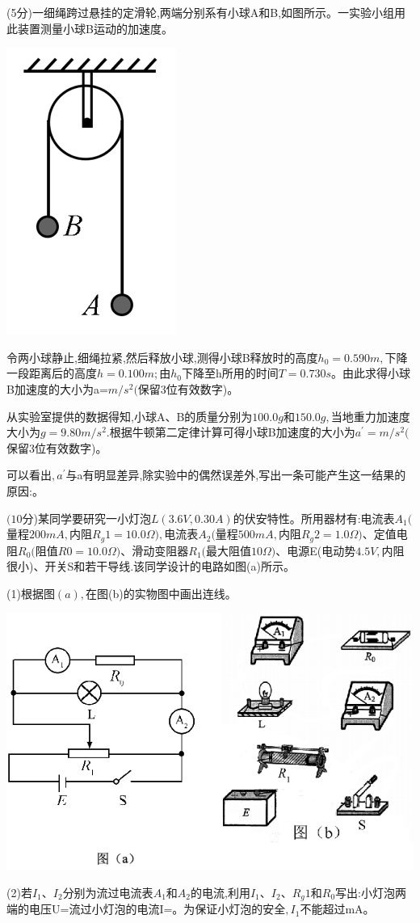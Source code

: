 \question[6] (5分)一细绳跨过悬挂的定滑轮,两端分别系有小球A和B,如图所示。一实验小组用此装置测量小球B运动的加速度。
\begin{center}
    \includegraphics[]{img/image5.png}
    \end{center}
令两小球静止,细绳拉紧,然后释放小球,测得小球B释放时的高度$h_0=0.590m,$下降一段距离后的高度$h=0.100m;$由$h_0$下降至h所用的时间$T=0.730s$。由此求得小球B加速度的大小为a=$m/s^2($保留3位有效数字)。

从实验室提供的数据得知,小球A、B的质量分别为$100.0g$和$150.0g,$当地重力加速度大小为$g=9.80m/s^2.$根据牛顿第二定律计算可得小球B加速度的大小为$a^\prime=$$m/s^2($保留3位有效数字)。

可以看出$,a^\prime$与a有明显差异,除实验中的偶然误差外,写出一条可能产生这一结果的原因:。


\question[6] $(10$分)某同学要研究一小灯泡$L(3.6V,0.30A)$的伏安特性。所用器材有:电流表$A_1($量程$200mA,$内阻$R_g1=10.0Ω),$电流表$A_2($量程$500mA,$内阻$R_g2=1.0Ω)$、定值电阻$R_0($阻值$R0=10.0Ω)$、滑动变阻器$R_1($最大阻值$10Ω)$、电源E(电动势$4.5V,$内阻很小)、开关S和若干导线.该同学设计的电路如图(a)所示。

(1)根据图$(a),$在图(b)的实物图中画出连线。
\begin{center}
    \includegraphics[]{img/image6.png}
    \end{center}
(2)若$I_1$、$I_2$分别为流过电流表$A_1$和$A_2$的电流,利用$I_1$、$I_2$、$R_g1$和$R_0$写出:小灯泡两端的电压U=流过小灯泡的电流I=。为保证小灯泡的安全$,I_1$不能超过mA。

